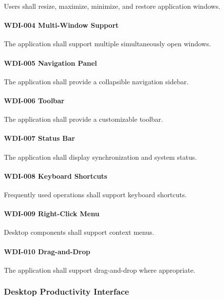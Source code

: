 Users shall resize, maximize, minimize, and restore application windows.

\paragraph{WDI-004 Multi-Window Support}

The application shall support multiple simultaneously open windows.

\paragraph{WDI-005 Navigation Panel}

The application shall provide a collapsible navigation sidebar.

\paragraph{WDI-006 Toolbar}

The application shall provide a customizable toolbar.

\paragraph{WDI-007 Status Bar}

The application shall display synchronization and system status.

\paragraph{WDI-008 Keyboard Shortcuts}

Frequently used operations shall support keyboard shortcuts.

\paragraph{WDI-009 Right-Click Menu}

Desktop components shall support context menus.

\paragraph{WDI-010 Drag-and-Drop}

The application shall support drag-and-drop where appropriate.


\subsubsection*{Desktop Productivity Interface}

